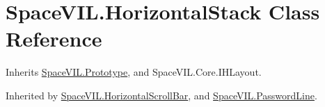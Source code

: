 \hypertarget{class_space_v_i_l_1_1_horizontal_stack}{}\section{Space\+V\+I\+L.\+Horizontal\+Stack Class Reference}
\label{class_space_v_i_l_1_1_horizontal_stack}


Inherits \mbox{\hyperlink{class_space_v_i_l_1_1_prototype}{Space\+V\+I\+L.\+Prototype}}, and Space\+V\+I\+L.\+Core.\+I\+H\+Layout.



Inherited by \mbox{\hyperlink{class_space_v_i_l_1_1_horizontal_scroll_bar}{Space\+V\+I\+L.\+Horizontal\+Scroll\+Bar}}, and \mbox{\hyperlink{class_space_v_i_l_1_1_password_line}{Space\+V\+I\+L.\+Password\+Line}}.

